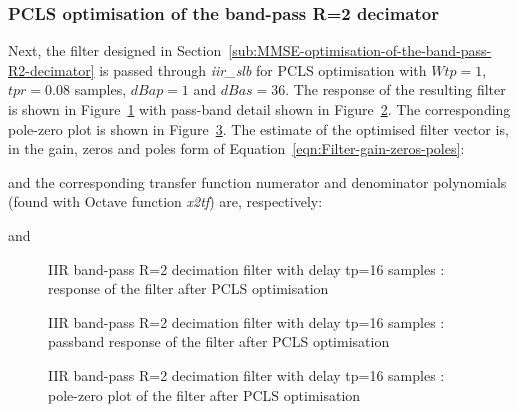 \documentclass[a4paper,twoside,10pt,english]{report}
\begin{document}
\subsubsection{PCLS optimisation of the band-pass R=2 decimator}
Next, the filter designed in 
Section~\ref{sub:MMSE-optimisation-of-the-band-pass-R2-decimator} is passed 
through \emph{iir\_slb} for PCLS optimisation with $Wtp=1$, $tpr=0.08$ samples, 
$dBap=1$ and $dBas=36$. The response of the resulting filter is shown 
in Figure~\ref{fig:iir-sqp-slb-bandpass-test-pcls-d1} with pass-band detail
shown in Figure~\ref{fig:iir-sqp-slb-bandpass-test-pcls-d1-passband}. The
corresponding pole-zero plot is shown in
Figure~\ref{fig:iir-sqp-slb-bandpass-test-pcls-d1-pz}. The estimate of the
optimised filter vector is, in the gain, zeros and poles form of
Equation~\ref{eqn:Filter-gain-zeros-poles}:
\begin{small}

\end{small}
and the corresponding transfer function numerator and denominator polynomials
(found with Octave function \emph{x2tf}) are, respectively:
\begin{small}

\end{small}
and
\begin{small}

\end{small}
\begin{figure}[!htbp]
\begin{center}
\scalebox{0.7}{}
\caption{IIR band-pass R=2 decimation filter with delay tp=16 samples : response of the filter after PCLS optimisation}
\label{fig:iir-sqp-slb-bandpass-test-pcls-d1}
\end{center}
\end{figure}
\begin{figure}[!htbp]
\begin{center}
\scalebox{0.7}{}
\caption{IIR band-pass R=2 decimation filter with delay tp=16 samples : passband response of the filter after PCLS optimisation}
\label{fig:iir-sqp-slb-bandpass-test-pcls-d1-passband}
\end{center}
\end{figure}
\begin{figure}[!htbp]
\begin{center}
\scalebox{0.7}{}
\caption{IIR band-pass R=2 decimation filter with delay tp=16 samples : pole-zero plot of the filter after PCLS optimisation}
\label{fig:iir-sqp-slb-bandpass-test-pcls-d1-pz}
\end{center}
\end{figure}
\clearpage
\end{document}
